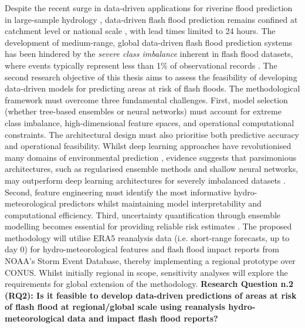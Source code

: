 Despite  the recent surge in data-driven applications for riverine flood prediction in large-sample hydrology \citep{Nearing_2024}, data-driven flash flood prediction remains confined at catchment level \citep{Ding_2025, Zhao_2025, Song_2020, Saleh_2024} or national scale \citep{Zhao_2022}, with lead times limited to 24 hours. The development of medium-range, global data-driven flash flood prediction systems has been hindered by the \textit{severe class imbalance} inherent in flash flood datasets, where events typically represent less than 1\% of observational records \citep{Kratzert_2023, Färber_2024, Panwar_2020, Jonkman_2024}. The second research objective of this thesis aims to assess the feasibility of developing data-driven models for predicting areas at risk of flash floods. The methodological framework must overcome three fundamental challenges. First, model selection (whether tree-based ensembles or neural networks) must account for extreme class imbalance, high-dimensional feature spaces, and operational computational constraints. The architectural design must also prioritise both predictive accuracy and operational feasibility. Whilst deep learning approaches have revolutionised many domains of environmental prediction \citep{Lang_2024, Nearing_2024}, evidence suggests that parsimonious architectures, such as regularised ensemble methods and shallow neural networks, may outperform deep learning architectures for severely imbalanced datasets \citep{Kumar_2021, Xu_2022, Luo_2025a}.  Second, feature engineering must identify the most informative hydro-meteorological predictors whilst maintaining model interpretability and computational efficiency. Third, uncertainty quantification through ensemble modelling becomes essential for providing reliable risk estimates \citep{Saleh_2024}. The proposed methodology will utilise ERA5 reanalysis data (i.e. short-range forecasts, up to day 0) for hydro-meteorological features and flash flood impact reports from NOAA's Storm Event Database, thereby implementing a regional prototype over CONUS. Whilst initially regional in scope, sensitivity analyses will explore the requirements for global extension of the methodology. \textbf{Research Question n.2 (RQ2): Is it feasible to develop data-driven predictions of areas at risk of flash flood at regional/global scale using reanalysis hydro-meteorological data and impact flash flood reports?}

